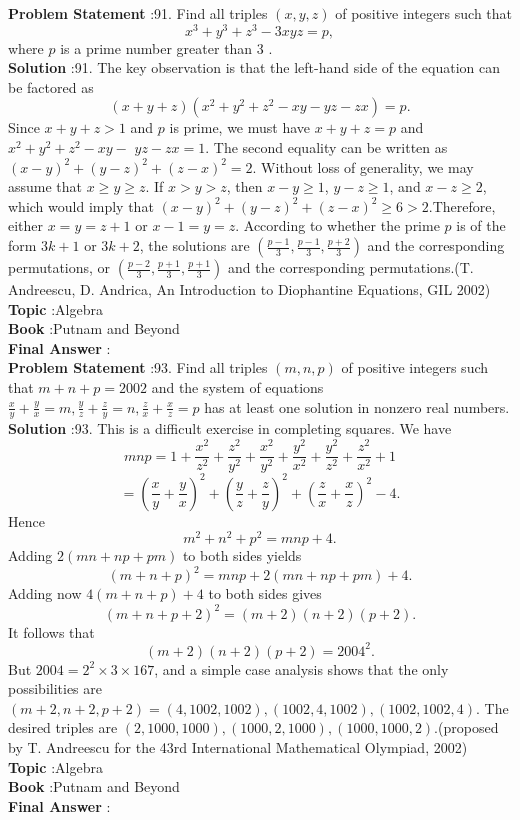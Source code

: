 \documentclass[10pt]{article}
\begin{document}
\textbf{Problem Statement} :91. Find all triples $(x, y, z)$ of positive integers such that$$ x^{3}+y^{3}+z^{3}-3 x y z=p, $$where $p$ is a prime number greater than 3 .\\
\textbf{Solution} :91. The key observation is that the left-hand side of the equation can be factored as$$ (x+y+z)\left(x^{2}+y^{2}+z^{2}-x y-y z-z x\right)=p . $$Since $x+y+z>1$ and $p$ is prime, we must have $x+y+z=p$ and $x^{2}+y^{2}+z^{2}-x y-$ $y z-z x=1$. The second equality can be written as $(x-y)^{2}+(y-z)^{2}+(z-x)^{2}=2$. Without loss of generality, we may assume that $x \geq y \geq z$. If $x>y>z$, then $x-y \geq 1$, $y-z \geq 1$, and $x-z \geq 2$, which would imply that $(x-y)^{2}+(y-z)^{2}+(z-x)^{2} \geq 6>2$.Therefore, either $x=y=z+1$ or $x-1=y=z$. According to whether the prime $p$ is of the form $3 k+1$ or $3 k+2$, the solutions are $\left(\frac{p-1}{3}, \frac{p-1}{3}, \frac{p+2}{3}\right)$ and the corresponding permutations, or $\left(\frac{p-2}{3}, \frac{p+1}{3}, \frac{p+1}{3}\right)$ and the corresponding permutations.(T. Andreescu, D. Andrica, An Introduction to Diophantine Equations, GIL 2002)\\
\textbf{Topic} :Algebra\\
\textbf{Book} :Putnam and Beyond\\
\textbf{Final Answer} :\\


\textbf{Problem Statement} :93. Find all triples $(m, n, p)$ of positive integers such that $m+n+p=2002$ and the system of equations $\frac{x}{y}+\frac{y}{x}=m, \frac{y}{z}+\frac{z}{y}=n, \frac{z}{x}+\frac{x}{z}=p$ has at least one solution in nonzero real numbers.\\
\textbf{Solution} :93. This is a difficult exercise in completing squares. We have$$ m n p=1+\frac{x^{2}}{z^{2}}+\frac{z^{2}}{y^{2}}+\frac{x^{2}}{y^{2}}+\frac{y^{2}}{x^{2}}+\frac{y^{2}}{z^{2}}+\frac{z^{2}}{x^{2}}+1 $$$$ =\left(\frac{x}{y}+\frac{y}{x}\right)^{2}+\left(\frac{y}{z}+\frac{z}{y}\right)^{2}+\left(\frac{z}{x}+\frac{x}{z}\right)^{2}-4 . $$Hence$$ m^{2}+n^{2}+p^{2}=m n p+4 . $$Adding $2(m n+n p+p m)$ to both sides yields$$ (m+n+p)^{2}=m n p+2(m n+n p+p m)+4 . $$Adding now $4(m+n+p)+4$ to both sides gives$$ (m+n+p+2)^{2}=(m+2)(n+2)(p+2) . $$It follows that$$ (m+2)(n+2)(p+2)=2004^{2} . $$But $2004=2^{2} \times 3 \times 167$, and a simple case analysis shows that the only possibilities are $(m+2, n+2, p+2)=(4,1002,1002),(1002,4,1002),(1002,1002,4)$. The desired triples are $(2,1000,1000),(1000,2,1000),(1000,1000,2)$.(proposed by T. Andreescu for the 43rd International Mathematical Olympiad, 2002)\\
\textbf{Topic} :Algebra\\
\textbf{Book} :Putnam and Beyond\\
\textbf{Final Answer} :\\
\end{document}
